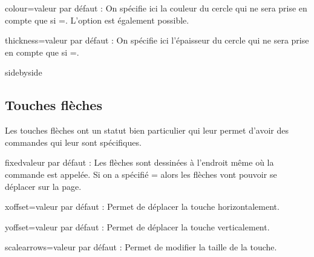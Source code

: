 \documentclass[10pt,french,a4paper]{article}
\begin{document}
\begin{docKey}{colour}{=}{valeur par défaut : }
    On spécifie ici la couleur du cercle qui ne sera prise en compte que si =. L'option  est également possible.
\end{docKey}

\begin{docKey}{thickness}{=}{valeur par défaut : \docValue{1pt}}
    On spécifie ici l'épaisseur du cercle qui ne sera prise en compte que si =.
\end{docKey}

\begin{dispExample*}{sidebyside}
\Touche[principal={$x,t,\theta,n$}, second={échanger}, fontsize=7pt, position=0.8, circle=true]
\Touche[style=enter,fontsize=7pt, principal=entrer, second=préc, alpha=résol, circle=true, thickness=0.5pt, colour=blue, radius=25pt]
\end{dispExample*}

\subsection{Touches flèches}

Les touches flèches ont un statut bien particulier qui leur permet d'avoir des commandes qui leur sont spécifiques.

\begin{docKey}{fixed}{}{valeur par défaut : }
    Les flèches sont dessinées à l'endroit même où la commande est appelée. Si on a spécifié = alors les flèches vont pouvoir se déplacer sur la page.
\end{docKey}

\begin{docKey}{xoffset}{=}{valeur par défaut : \docValue{0cm}}
    Permet de déplacer la touche horizontalement.
\end{docKey}

\begin{docKey}{yoffset}{=}{valeur par défaut : \docValue{0cm}}
    Permet de déplacer la touche verticalement.
\end{docKey}

\begin{docKey}{scalearrows}{=}{valeur par défaut : }
    Permet de modifier la taille de la touche.
\end{docKey}
\end{document}
